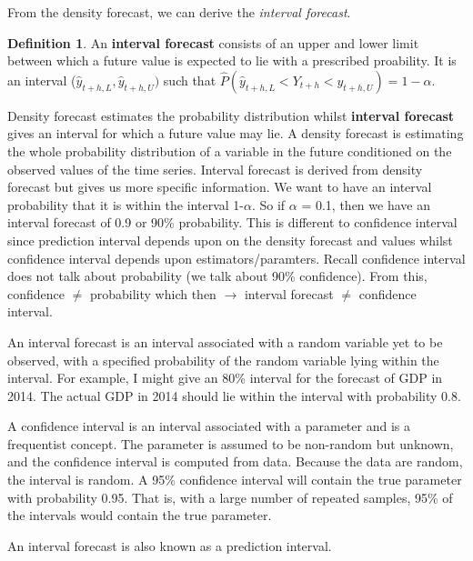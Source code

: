 \documentclass[11pt, oneside]{article}
\theoremstyle{definition}
\newtheorem{definition}{Definition}[section]
\begin{document}
From the density forecast, we can derive the \textit{interval forecast}.
\begin{definition}
An \textbf{interval forecast} consists of an upper and lower limit between which a future value is expected to lie with a prescribed proability. It is an interval ($\hat{y}_{t+h,L},\hat{y}_{t+h,U})$ such that $\hat{P}(\hat{y}_{t+h,L} < Y_{t+h} < y_{t+h,U}) = 1 - \alpha$.
\end{definition}

Density forecast estimates the probability distribution whilst \textbf{interval forecast} gives an interval for which a future value may lie. A density forecast is estimating the whole probability distribution of a variable in the future conditioned on the observed values of the time series. Interval forecast is derived from density forecast but gives us more specific information. We want to have an interval probability that it is within the interval 1-$\alpha$. So if $\alpha$ = 0.1, then we have an interval forecast of 0.9 or 90\% probability. This is different to confidence interval since prediction interval depends upon on the density forecast and values whilst confidence interval depends upon estimators/paramters. Recall confidence interval does not talk about probability (we talk about 90\% confidence). From this, confidence $\neq$ probability which then $\rightarrow$ interval forecast $\neq$ confidence interval.

An interval forecast is an interval associated with a random variable yet to be observed, with a specified probability of the random variable lying within the interval. For example, I might give an 80\% interval for the forecast of GDP in 2014. The actual GDP in 2014 should lie within the interval with probability 0.8.

A confidence interval is an interval associated with a parameter and is a frequentist concept. The parameter is assumed to be non-random but unknown, and the confidence interval is computed from data. Because the data are random, the interval is random. A 95\% confidence interval will contain the true parameter with probability 0.95. That is, with a large number of repeated samples, 95\% of the intervals would contain the true parameter.

An interval forecast is also known as a prediction interval.
\end{document}
